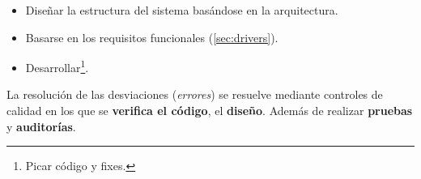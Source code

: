 \begin{itemize}[noitemsep]
\item Diseñar la estructura del sistema basándose en la arquitectura.
\item Basarse en los requisitos funcionales (\ref{sec:drivers}).
\item Desarrollar\footnote{Picar código y fixes.}.
\end{itemize}

La resolución de las desviaciones (\emph{errores}) se resuelve
mediante controles de calidad en los que se \textbf{verifica el
  código}, el \textbf{diseño}. Además de realizar \textbf{pruebas} y
\textbf{auditorías}.

